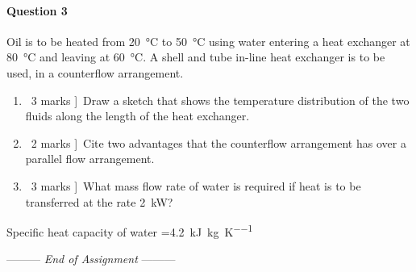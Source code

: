 \documentclass[a4paper,12pt,fleqn]{article}
\newcommand{\lastwords}{End of Assignment}
\begin{document}
\paragraph{\textbf{Question 3} \ }
Oil is to be heated from \SI{20}{\celsius} to \SI{50}{\celsius} using water entering a heat exchanger at \SI{80}{\celsius} and leaving at \SI{60}{\celsius}. A shell and tube in-line heat exchanger is to be used, in a counterflow arrangement. 
\begin{enumerate}[label=\alph*)]
\item \lbrack\ 3 marks ]\ Draw a sketch that shows the temperature distribution of the two fluids along the length of the heat exchanger.
\item \lbrack\ 2 marks ]\ Cite two advantages that the counterflow arrangement has over a parallel flow arrangement.
\item \lbrack\ 3 marks ]\ What mass flow rate of water is required if heat is to be transferred at the rate \SI{2}{\kilo\watt}?
\end{enumerate}
Specific heat capacity of water =\SI{4.2}{\kilo\joule\per\kg\per\kelvin}



\begin{center}
\vspace{3cm}
--------- \textit{\lastwords} ---------
\end{center}


\label{finalpage}
\end{document}
